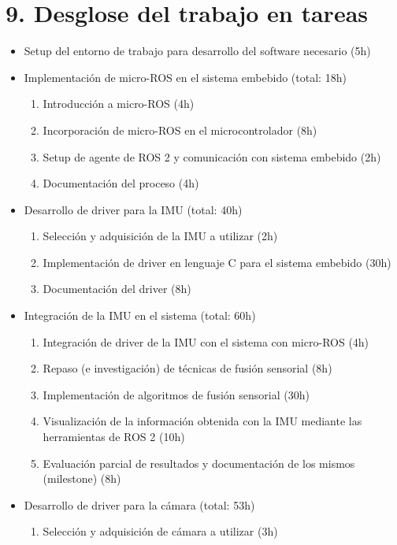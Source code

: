 \documentclass[
11pt, %
codirector, %
]{charter}
\begin{document}
\section{9. Desglose del trabajo en tareas}
\label{sec:wbs}

\begin{itemize}
	\item Setup del entorno de trabajo para desarrollo del software necesario (5h)
	\item Implementación de micro-ROS en el sistema embebido (total: 18h)
	\begin{enumerate}
		\item Introducción a micro-ROS (4h)
		\item Incorporación de micro-ROS en el microcontrolador (8h)
		\item Setup de agente de ROS 2 y comunicación con sistema embebido (2h)
		\item Documentación del proceso (4h)
	\end{enumerate}
	\item Desarrollo de driver para la IMU (total: 40h)
	\begin{enumerate}
		\item Selección y adquisición de la IMU a utilizar (2h)
		\item Implementación de driver en lenguaje C para el sistema embebido (30h)
		\item Documentación del driver (8h)
	\end{enumerate}
	\item Integración de la IMU en el sistema (total: 60h)
	\begin{enumerate}
		\item Integración de driver de la IMU con el sistema con micro-ROS (4h)
		\item Repaso (e investigación) de técnicas de fusión sensorial (8h)
		\item Implementación de algoritmos de fusión sensorial (30h)
		\item Visualización de la información obtenida con la IMU mediante las herramientas de ROS 2 (10h)
		\item Evaluación parcial de resultados y documentación de los mismos (milestone) (8h)
	\end{enumerate}
	\item Desarrollo de driver para la cámara (total: 53h)
	\begin{enumerate}
		\item Selección y adquisición de cámara a utilizar (3h)

\end{enumerate}
\end{itemize}
\end{document}
